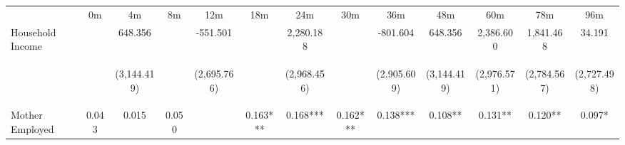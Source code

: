 \begin{tabular}{lcccccccccccc}
\hline \noalign{\smallskip} & 0m & 4m & 8m & 12m & 18m & 24m & 30m & 36m & 48m & 60m & 78m & 96m\\
\noalign{\smallskip}\hline \noalign{\smallskip}Household Income &  & 648.356 &  & -551.501 &  & 2,280.188 &  & -801.604 & 648.356 & 2,386.600 & 1,841.468 & 34.191\\
 & \begin{footnotesize}\end{footnotesize} & \begin{footnotesize}(3,144.419)\end{footnotesize} & \begin{footnotesize}\end{footnotesize} & \begin{footnotesize}(2,695.766)\end{footnotesize} & \begin{footnotesize}\end{footnotesize} & \begin{footnotesize}(2,968.456)\end{footnotesize} & \begin{footnotesize}\end{footnotesize} & \begin{footnotesize}(2,905.609)\end{footnotesize} & \begin{footnotesize}(3,144.419)\end{footnotesize} & \begin{footnotesize}(2,976.571)\end{footnotesize} & \begin{footnotesize}(2,784.567)\end{footnotesize} & \begin{footnotesize}(2,727.498)\end{footnotesize}\\
\noalign{\smallskip}Mother Employed & 0.043 & 0.015 & 0.050 &  & 0.163*** & 0.168*** & 0.162*** & 0.138*** & 0.108** & 0.131** & 0.120** & 0.097*\\

\end{tabular}
